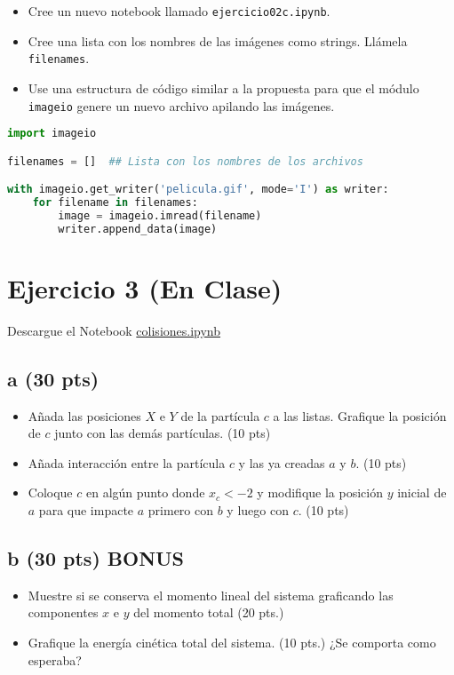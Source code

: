 \documentclass{article}
\begin{document}
\begin{itemize}
    \item Cree un nuevo notebook llamado \texttt{ejercicio02c.ipynb}.
    \item Cree una lista con los nombres de las imágenes como strings. Llámela  \texttt{filenames}.
    \item Use una estructura de código similar a la propuesta para que el módulo \texttt{imageio} genere un nuevo archivo apilando las imágenes.
\end{itemize}




\begin{lstlisting}[language=Python, caption=ejercicio02x.ipynb]
import imageio

filenames = []  ## Lista con los nombres de los archivos

with imageio.get_writer('pelicula.gif', mode='I') as writer:
    for filename in filenames:
        image = imageio.imread(filename)
        writer.append_data(image)
\end{lstlisting}


\section*{Ejercicio 3 (En Clase)}

Descargue el Notebook \href{https://github.com/ComputoCienciasUniandes/FISI2026-201910/raw/master/Talleres/Grupo_2/colisiones.ipynb}{colisiones.ipynb}

\subsection*{a (30 pts)}

\begin{itemize}
    \item Añada las posiciones $X$ e $Y$ de la partícula $c$ a las listas. Grafique la posición de $c$ junto con las demás partículas. (10 pts)
    \item Añada interacción entre la partícula $c$ y las ya creadas $a$ y $b$. (10 pts)
    \item Coloque $c$ en algún punto donde $x_c < -2$ y modifique la posición $y$ inicial de $a$ para que impacte $a$ primero con $b$ y luego con $c$. (10 pts)
    
    
\end{itemize}

\subsection*{b (30 pts) BONUS}
\begin{itemize}
    \item Muestre si se conserva el momento lineal del sistema graficando las componentes $x$ e $y$ del momento total (20 pts.)
    \item Grafique la energía cinética total del sistema. (10 pts.)
    ¿Se comporta como esperaba?
\end{itemize}
\end{document}
